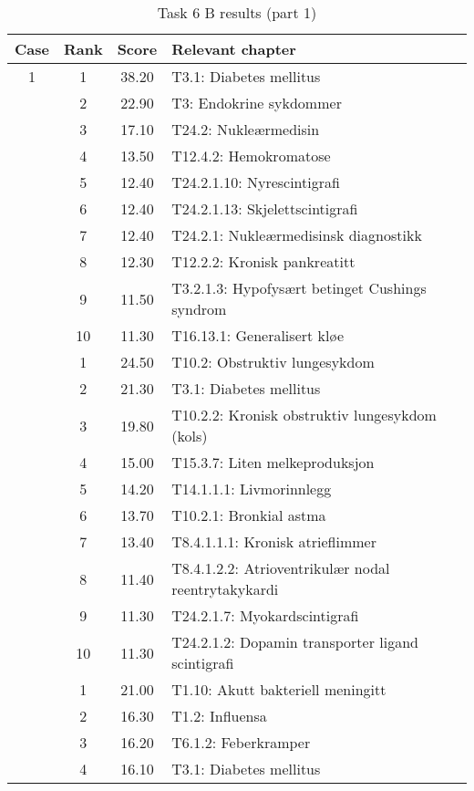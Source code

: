 \begin{table}[htbp] \footnotesize \center
\caption{Task 6 B results (part 1)\label{tab:task6b1}}
\begin{tabular}{c c c l}
    \toprule
    Case & Rank & Score & Relevant chapter \\
    \midrule
    1 & 1 & 38.20 & T3.1: Diabetes mellitus \\
     & 2 & 22.90 & T3: Endokrine sykdommer \\
     & 3 & 17.10 & T24.2: Nukleærmedisin \\
     & 4 & 13.50 & T12.4.2: Hemokromatose \\
     & 5 & 12.40 & T24.2.1.10: Nyrescintigrafi \\
     & 6 & 12.40 & T24.2.1.13: Skjelettscintigrafi \\
     & 7 & 12.40 & T24.2.1: Nukleærmedisinsk diagnostikk \\
     & 8 & 12.30 & T12.2.2: Kronisk pankreatitt \\
     & 9 & 11.50 & T3.2.1.3: Hypofysært betinget Cushings syndrom \\
     & 10 & 11.30 & T16.13.1: Generalisert kløe \\
	\addlinespace
    2 & 1 & 24.50 & T10.2: Obstruktiv lungesykdom \\
     & 2 & 21.30 & T3.1: Diabetes mellitus \\
     & 3 & 19.80 & T10.2.2: Kronisk obstruktiv lungesykdom (kols) \\
     & 4 & 15.00 & T15.3.7: Liten melkeproduksjon \\
     & 5 & 14.20 & T14.1.1.1: Livmorinnlegg \\
     & 6 & 13.70 & T10.2.1: Bronkial astma \\
     & 7 & 13.40 & T8.4.1.1.1: Kronisk atrieflimmer \\
     & 8 & 11.40 & T8.4.1.2.2: Atrioventrikulær nodal reentrytakykardi \\%
     & 9 & 11.30 & T24.2.1.7: Myokardscintigrafi \\
     & 10 & 11.30 & T24.2.1.2: Dopamin transporter ligand scintigrafi \\
	\addlinespace
    3 & 1 & 21.00 & T1.10: Akutt bakteriell meningitt \\
     & 2 & 16.30 & T1.2: Influensa \\
     & 3 & 16.20 & T6.1.2: Feberkramper \\
     & 4 & 16.10 & T3.1: Diabetes mellitus \\

\end{tabular}
\end{table}
